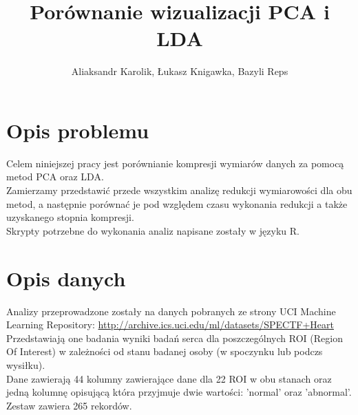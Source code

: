 \documentclass[10pt,a4paper]{article}
\begin{document}
\title{Porównanie wizualizacji PCA i LDA}
\author{Aliaksandr Karolik, Łukasz Knigawka, Bazyli Reps}
\maketitle


\newpage

\section{Opis problemu}
Celem niniejszej pracy jest porównianie kompresji wymiarów danych za pomocą metod PCA oraz LDA. 
\\
Zamierzamy przedstawić przede wszystkim analizę redukcji wymiarowości dla obu metod, a następnie porównać je pod względem czasu wykonania redukcji a także uzyskanego stopnia kompresji. 
\\
Skrypty potrzebne do wykonania analiz napisane zostały w języku R.

\section{Opis danych}
Analizy przeprowadzone zostały na danych pobranych ze strony UCI Machine Learning Repository:
\url{http://archive.ics.uci.edu/ml/datasets/SPECTF+Heart}
\\
Przedstawiają one badania wyniki badań serca dla poszczególnych ROI (Region Of Interest) w zależności od stanu badanej osoby (w spoczynku lub podczs wysiłku).
\\
Dane zawierają 44 kolumny zawierające dane dla 22 ROI w obu stanach oraz jedną kolumnę opisującą która przyjmuje dwie wartości: 'normal' oraz 'abnormal'. Zestaw zawiera 265 rekordów.

\newpage
\end{document}
